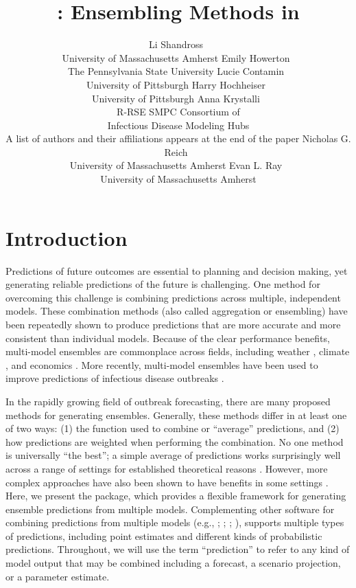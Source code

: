 \documentclass[
  article,
  shortnames,
  notitle]{jss}
\author{Li Shandross~\orcidlink{0009-0008-1348-1954}\\University of
Massachusetts Amherst \And Emily
Howerton~\orcidlink{0000-0002-0639-3728}\\The Pennsylvania State
University \AND Lucie
Contamin~\orcidlink{0000-0001-5797-1279}\\University of
Pittsburgh \And Harry
Hochheiser~\orcidlink{0000-0001-8793-9982}\\University of
Pittsburgh \AND Anna Krystalli~\orcidlink{0000-0002-2378-4915}\\R-RSE
SMPC \And Consortium of\\
Infectious Disease Modeling Hubs\\A list of authors and their
affiliations appears at the end of the paper \AND Nicholas G.
Reich~\orcidlink{0000-0003-3503-9899}\\University of Massachusetts
Amherst \And Evan L. Ray~\orcidlink{0000-0003-4035-0243}\\University of
Massachusetts Amherst}
\title{\pkg{hubEnsembles}: Ensembling Methods in \proglang{R}}
\begin{document}
\maketitle

\section{Introduction}\label{sec-intro}

Predictions of future outcomes are essential to planning and decision
making, yet generating reliable predictions of the future is
challenging. One method for overcoming this challenge is combining
predictions across multiple, independent models. These combination
methods (also called aggregation or ensembling) have been repeatedly
shown to produce predictions that are more accurate
\citep{clemen1989, timmermann2006} and more consistent \citep{hibon2005}
than individual models. Because of the clear performance benefits,
multi-model ensembles are commonplace across fields, including weather
\citep{alley2019}, climate \citep{tebaldi2007}, and economics
\citep{aastveit2018}. More recently, multi-model ensembles have been
used to improve predictions of infectious disease outbreaks
\citep{viboud2018, johansson2019, mcgowan2019, reich_accuracy_2019, cramer2022}.

In the rapidly growing field of outbreak forecasting, there are many
proposed methods for generating ensembles. Generally, these methods
differ in at least one of two ways: (1) the function used to combine or
``average'' predictions, and (2) how predictions are weighted when
performing the combination. No one method is universally ``the best''; a
simple average of predictions works surprisingly well across a range of
settings \citep{mcgowan2019, paireau_ensemble_2022, ray_comparing_2023}
for established theoretical reasons \citep{winkler2015}. However, more
complex approaches have also been shown to have benefits in some
settings
\citep{yamana_superensemble_2016, ray_prediction_2018, reich_accuracy_2019, colon-gonzalez_probabilistic_2021}.
Here, we present the  package, which provides a
flexible framework for generating ensemble predictions from multiple
models. Complementing other software for combining predictions from
multiple models (e.g., \citet{pedregosa_scikit-learn_2011};
\citet{weiss2019}; \citet{bosse_stackr_2023};
\citet{couch_stacks_2023}),  supports multiple types
of predictions, including point estimates and different kinds of
probabilistic predictions. Throughout, we will use the term
``prediction'' to refer to any kind of model output that may be combined
including a forecast, a scenario projection, or a parameter estimate.
\end{document}
